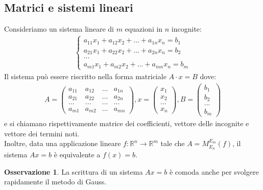 \documentclass[a4paper]{article}
\theoremstyle{definition}
\newtheorem*{oss}{Osservazione}
\begin{document}
\subsection{Matrici e sistemi lineari}
	Consideriamo un sistema lineare di $m$ equazioni in $n$ incognite:
	\begin{align*}
		\begin{cases}
			a_{11}x_1 + a_{12}x_2 + ... + a_{1n}x_n = b_1 \\
			a_{21}x_1 + a_{22}x_2 + ... + a_{2n}x_n = b_2 \\
			... \\
			a_{m1}x_1 + a_{m2}x_2 + ... + a_{mn}x_n = b_m
		\end{cases}
	\end{align*}
	Il sistema può essere riscritto nella forma matriciale $A \cdot x = B$ dove:
	\begin{align*}
		A = \begin{pmatrix}
			a_{11} & a_{12} & ... & a_{1n} \\
			a_{21} & a_{22} & ... & a_{2n} \\
			...    & ...    & ... & ...    \\
			a_{m1} & a_{m2} & ... & a_{mn}
		\end{pmatrix}, x = \begin{pmatrix}
			x_1 \\
			x_2 \\
			... \\
			x_n
		\end{pmatrix}, B = \begin{pmatrix}
			b_1 \\
			b_2 \\
			... \\
			b_m
		\end{pmatrix}
	\end{align*}
	e si chiamano rispettivamente matrice dei coefficienti, vettore delle incognite e vettore dei termini noti. \\
	Inoltre, data una applicazione lineare $f: \mathbb{R}^n \rightarrow \mathbb{R}^m$ tale che $A = M_{E_n}^{E_m}(f)$, il sistema $Ax = b$ è equivalente a $f(x) = b$.
	\begin{oss}
		La scrittura di un sistema $Ax=b$ è comoda anche per svolgere rapidamente il metodo di Gauss.
	\end{oss}
\end{document}
